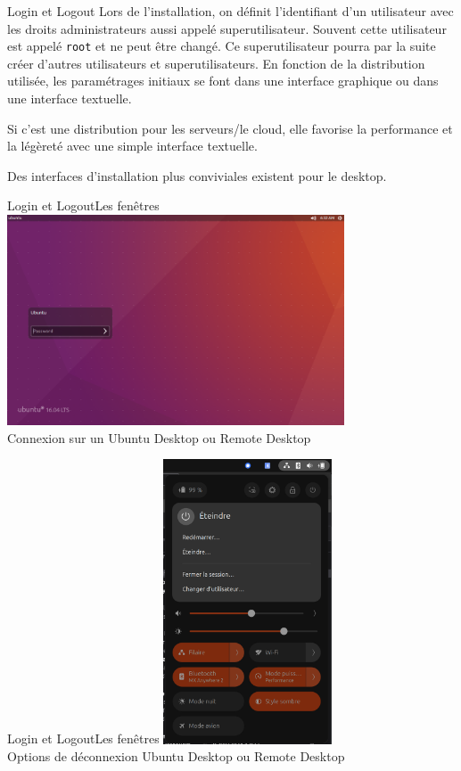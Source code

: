 \documentclass{beamer}
\begin{document}
    \begin{frame}{Login et Logout}
        Lors de l'installation, on définit l'identifiant d'un utilisateur avec les droits administrateurs aussi appelé superutilisateur.
        Souvent cette utilisateur est appelé \lstinline{root} et ne peut être changé.
        \bigbreak
        Ce superutilisateur pourra par la suite créer d'autres utilisateurs et superutilisateurs.
        \bigbreak
        En fonction de la distribution utilisée, les paramétrages initiaux se font dans une interface graphique ou dans une interface textuelle.

        Si c'est une distribution pour les serveurs/le cloud, elle favorise la performance et la légèreté avec une simple interface textuelle.

        Des interfaces d'installation plus conviviales existent pour le desktop.
    \end{frame}

    \begin{frame}{Login et Logout}{Les fenêtres}
        \centering
        \includegraphics[width=10cm]{image/Ubuntu-login-screen} \\ Connexion sur un Ubuntu Desktop ou Remote Desktop \\
    \end{frame}

    \begin{frame}{Login et Logout}{Les fenêtres}
        \centering
        \includegraphics[width=5cm]{image/Ubuntu-logout-screen} \\ Options de déconnexion Ubuntu Desktop ou Remote Desktop \\
    \end{frame}
\end{document}
